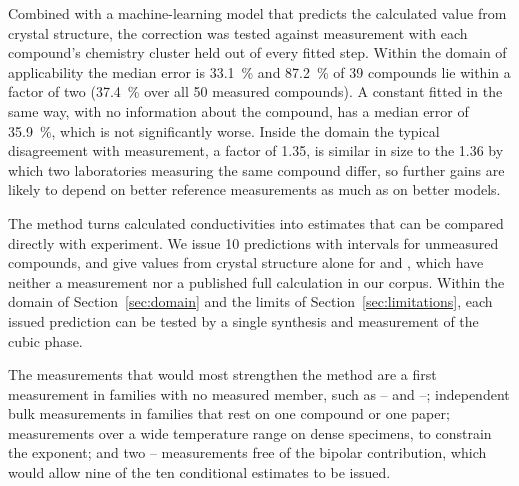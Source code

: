 Combined with a machine-learning model that predicts the calculated value from crystal structure,
the correction was tested against measurement with each compound's chemistry cluster held out of
every fitted step. Within the domain of applicability the median error is \SI{33.1}{\percent} and
\SI{87.2}{\percent} of \num{39} compounds lie within a factor of two (\SI{37.4}{\percent} over all \num{50} measured compounds). A constant fitted in the same way,
with no information about the compound, has a median error of \SI{35.9}{\percent}, which is not
significantly worse. Inside the domain the typical disagreement with measurement, a
factor of \num{1.35},
is similar in size to the \num{1.36} by which two laboratories measuring the same compound differ,
so further gains are likely to depend on better reference measurements as much as on better
models.

The method turns calculated conductivities into estimates that can be compared directly with
experiment. We issue \num{10} predictions with intervals for unmeasured compounds, and give values
from crystal structure alone for  and , which have neither a measurement
nor a published full calculation in our corpus. Within the domain of Section~\ref{sec:domain} and the limits of
Section~\ref{sec:limitations}, each issued prediction can be tested by a single synthesis and
measurement of the cubic phase.

The measurements that would most strengthen the method are a first measurement in families with no
measured member, such as -- and --; independent bulk measurements in
families that rest on one compound or one paper; measurements over a wide temperature range on dense
specimens, to constrain the exponent; and two -- measurements free of the bipolar
contribution, which would allow nine of the ten conditional estimates to be issued.

